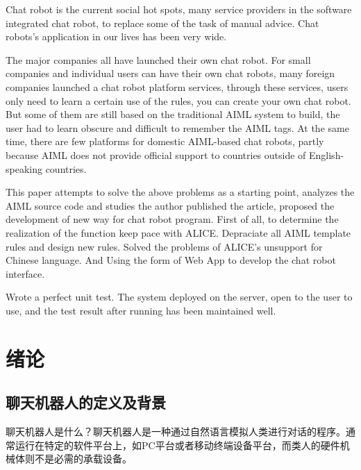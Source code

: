 \documentclass[bachelor,winfonts]{jnuthesis}
\begin{document}
\begin{englishabstract}
Chat robot is the current social hot spots, many service providers in the software integrated chat robot, to replace some of the task of manual advice. Chat robots's application in our lives has been very wide.

The major companies all have launched their own chat robot. For small companies and individual users can have their own chat robots, many foreign companies launched a chat robot platform services, through these services, users only need to learn a certain use of the rules, you can create your own chat robot. But some of them are still based on the traditional AIML system to build, the user had to learn obscure and difficult to remember the AIML tags. At the same time, there are few platforms for domestic AIML-based chat robots, partly because AIML does not provide official support to countries outside of English-speaking countries.

This paper attempts to solve the above problems as a starting point, analyzes the AIML source code and studies the author published the article, proposed the development of new way for chat robot program. First of all, to determine the realization of the function keep pace with ALICE. Depraciate all AIML template rules and design new rules. Solved the problems of ALICE's unsupport for Chinese language. And Using the form of Web App to develop the chat robot interface.

Wrote a perfect unit test. The system deployed on the server, open to the user to use, and the test result after running has been maintained well.

\end{englishabstract}

\tableofcontents

\mainmatter

\chapter{绪论}\label{chapter_introduction}
\section{聊天机器人的定义及背景}
聊天机器人是什么？聊天机器人是一种通过自然语言模拟人类进行对话的程序。通常运行在特定的软件平台上，如PC平台或者移动终端设备平台，而类人的硬件机械体则不是必需的承载设备。
\end{document}
